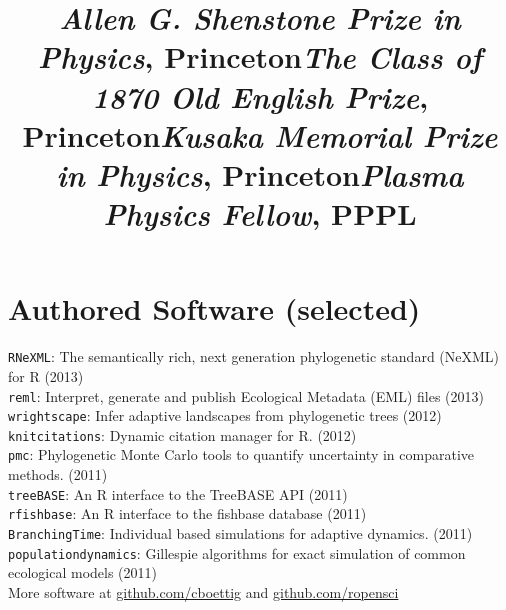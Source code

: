 \documentclass[margin]{res}
\begin{document}
\begin{resume}
\title{\emph{Allen G. Shenstone Prize in Physics}, Princeton}
\begin{position}   \vspace{-.8cm} \end{position}

\title{\emph{The Class of 1870 Old English Prize},  Princeton}
\begin{position}   \vspace{-.8cm} \end{position}

\title{\emph{Kusaka Memorial Prize in Physics}, Princeton}
\begin{position}   \vspace{-.8cm} \end{position}

\title{\emph{Plasma Physics Fellow},  PPPL }
\begin{position}   \vspace{-.8cm} \end{position}



  
  \section{Authored Software (selected)} 
{ \footnotesize
\texttt{RNeXML}: The semantically rich, next generation phylogenetic standard (NeXML) for R (2013) \\
\texttt{reml}: Interpret, generate and publish Ecological Metadata (EML) files (2013) \\
\texttt{wrightscape}: Infer adaptive landscapes from phylogenetic trees (2012) \\
\texttt{knitcitations}: Dynamic citation manager for R. (2012) \\
\texttt{pmc}: Phylogenetic Monte Carlo tools to quantify uncertainty in comparative methods. (2011)\\
\texttt{treeBASE}: An R interface to the TreeBASE API (2011) \\
\texttt{rfishbase}: An R interface to the fishbase database (2011) \\
\texttt{BranchingTime}: Individual based simulations for adaptive dynamics. (2011) \\
\texttt{populationdynamics}: Gillespie algorithms for exact simulation of common ecological models (2011) \\ 
More software at \href{http://github.com/cboettig}{github.com/cboettig} and \href{http://github.com/ropensci}{github.com/ropensci} 
}


\end{resume}
\end{document}
